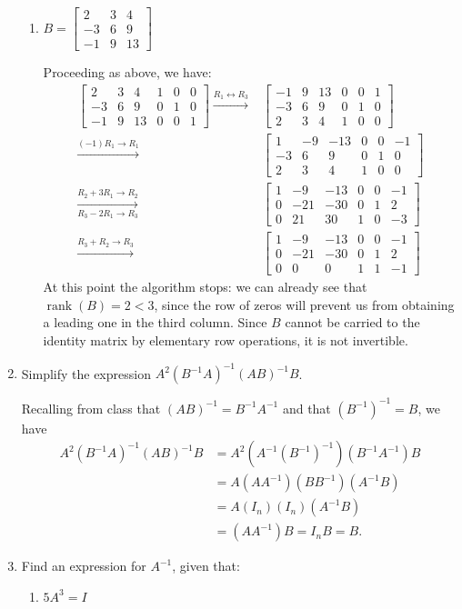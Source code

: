 \documentclass[12pt]{article}
\newcommand{\baam}{\left[\begin{array}{ccc|ccc}}
\newcommand{\eaam}{\end{array}\right]}
\newcommand{\bbm}{\begin{bmatrix}}
\newcommand{\ebm}{\end{bmatrix}}
\begin{document}
\begin{enumerate}
\begin{enumerate}
 \item $B = \bbm 2&3&4\\-3&6&9\\-1&9&13\ebm$

\bigskip

Proceeding as above, we have:
\begin{align*}
 \baam 2&3&4&1&0&0\\-3&6&9&0&1&0\\-1&9&13&0&0&1\eaam \xrightarrow{R_1\leftrightarrow R_3}& \baam -1&9&13&0&0&1\\-3&6&9&0&1&0\\2&3&4&1&0&0\eaam\\
\xrightarrow{(-1)R_1\to R_1} & \baam 1&-9&-13&0&0&-1\\-3&6&9&0&1&0\\2&3&4&1&0&0\eaam\\
\xrightarrow[R_3-2R_1\to R_3]{R_2+3R_1\to R_2} & \baam 1&-9&-13&0&0&-1\\0&-21&-30&0&1&2\\0&21&30&1&0&-3\eaam\\
\xrightarrow{R_3+R_2\to R_3} & \baam 1&-9&-13&0&0&-1\\0&-21&-30&0&1&2\\0&0&0&1&1&-1\eaam
\end{align*}
At this point the algorithm stops: we can already see that $\operatorname{rank}(B)=2<3$, since the row of zeros will prevent us from obtaining a leading one in the third column. Since $B$ cannot be carried to the identity matrix by elementary row operations, it is not invertible.
\end{enumerate}

\bigskip

\item Simplify the expression $A^2(B^{-1}A)^{-1}(AB)^{-1}B$.

\bigskip

Recalling from class that $(AB)^{-1} = B^{-1}A^{-1}$ and that $(B^{-1})^{-1}=B$, we have
\begin{align*}
 A^2(B^{-1}A)^{-1}(AB)^{-1}B & = A^2(A^{-1}(B^{-1})^{-1})(B^{-1}A^{-1})B\\
& = A(AA^{-1})(BB^{-1})(A^{-1}B)\\
& = A(I_n)(I_n)(A^{-1}B)\\
& = (AA^{-1})B = I_nB = B.
\end{align*}


\item Find an expression for $A^{-1}$, given that:
\begin{enumerate}
 \item $5A^3=I$


\end{enumerate}
\end{enumerate}
\end{document}
